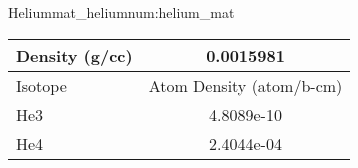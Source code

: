 \begin{matitem}{Helium}{mat_helium}{num:helium_mat}
  \centering
  \begin{tabular}{l c}
    \toprule
    Density (g/cc) & 0.0015981 \\
    \midrule
    Isotope & Atom Density (atom/b-cm) \\
    \midrule
    \midrule
He3 & 4.8089e-10 \\
He4 & 2.4044e-04 \\

    \bottomrule
  \end{tabular}
\end{matitem}
